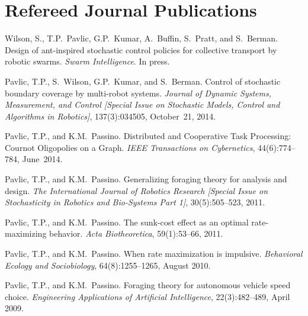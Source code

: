 \section{Refereed Journal Publications}

\begin{bibenum}
    \item Wilson, S., T.P.~Pavlic, G.P.~Kumar, A.~Buffin, S.~Pratt, and
        S.~Berman. Design of ant-inspired stochastic control policies
        for collective transport by robotic swarms. \emph{Swarm
        Intelligence}. In press.

    \item Pavlic, T.P., S.~Wilson, G.P.~Kumar, and S.~Berman. Control of
        stochastic boundary coverage by multi-robot systems.
        \emph{Journal of Dynamic Systems, Measurement, and Control
        [Special Issue on Stochastic Models, Control and Algorithms
        in Robotics]}, 137(3):034505, October~21, 2014.

    \item Pavlic, T.P., and K.M.~Passino. Distributed and Cooperative
        Task Processing: Cournot Oligopolies on a Graph.
        \emph{IEEE Transactions on Cybernetics}, 44(6):774--784, June~2014.

    \item Pavlic, T.P., and K.M.~Passino. Generalizing foraging theory
        for analysis and design. \emph{The International Journal of
        Robotics Research [Special Issue on Stochasticity in Robotics
        and Bio-Systems Part 1]}, 30(5):505--523, 2011.

    \item Pavlic, T.P., and K.M.~Passino. The sunk-cost effect as an
        optimal rate-maximizing behavior. \emph{Acta Biotheoretica},
        59(1):53--66, 2011.

    \item Pavlic, T.P., and K.M.~Passino. When rate maximization is
        impulsive. \emph{Behavioral Ecology and Sociobiology},
        64(8):1255--1265, August 2010.

    \item Pavlic, T.P., and K.M.~Passino. Foraging theory for autonomous
        vehicle speed choice. \emph{Engineering Applications of
        Artificial Intelligence}, 22(3):482--489, April 2009.\\
\end{bibenum}

\vspace{0.1in}